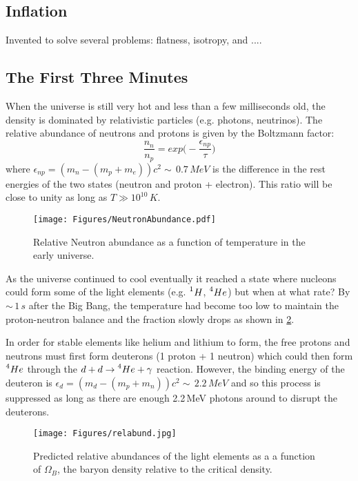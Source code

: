 \subsection{Inflation}
Invented to solve several problems: flatness, isotropy, and ....

\subsection{The First Three Minutes}
When the universe is still very hot and less than a few milliseconds old,
the density is dominated by relativistic particles (e.g. photons, neutrinos).
The relative abundance of neutrons and protons is given by the Boltzmann factor:
\begin{equation}
\frac{n_n}{n_p} = exp\bigg(-\frac{\epsilon_{np}}{\tau}\bigg)
\end{equation}
where $\epsilon_{np} = (m_n - (m_p + m_e))c^2 \sim\,0.7\,MeV$ is the difference in the rest energies of the two states (neutron and proton + electron). This ratio will be close to unity as long as $T \gg 10^{10}\,K$.
\begin{figure}[h]
\centering
\texttt{[image: Figures/NeutronAbundance.pdf]}
\caption{Relative Neutron abundance as a function of temperature in the early universe.}
\label{fig:Neutrons}
\end{figure}

As the universe continued to cool eventually it reached a state where nucleons could form some of the light elements (e.g. $\prescript{1}{}H$, 
$\prescript{4}{}He$) but when at what rate? By $\sim\,1\,s$ after the Big Bang, the temperature had become too low to maintain the proton-neutron balance and the fraction slowly drops as shown in \cref{fig:Neutrons}.

In order for stable elements like helium and lithium to form, the free
protons and neutrons must first form deuterons (1 proton + 1 neutron) which could then form $\prescript{4}{}He$ through the 
$d + d \rightarrow \prescript{4}{}He + \gamma$ reaction. However, the binding energy of the deuteron is $\epsilon_{d} = (m_d - (m_p + m_n))c^2 \sim\,2.2\,MeV$
and so this process is suppressed as long as there are enough 2.2\,MeV photons around to disrupt the deuterons.

\begin{figure}[h]
\centering
\texttt{[image: Figures/relabund.jpg]}
\caption{Predicted relative abundances of the light elements as a
a function of $\Omega_B$, the baryon density relative to the 
critical density.}
\label{fig:Neutrons}
\end{figure}

